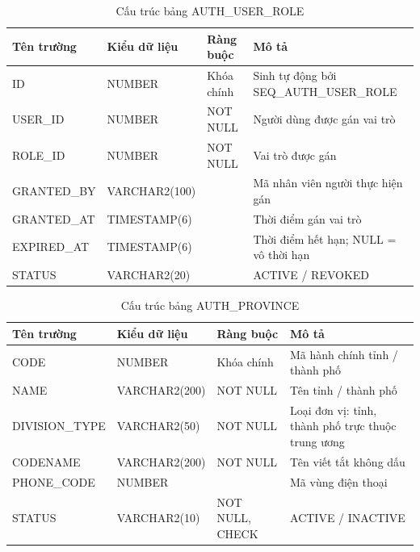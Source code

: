 \documentclass[../DoAn.tex]{subfiles}
\begin{document}
\begin{table}[H]
\centering
\caption{Cấu trúc bảng AUTH\_USER\_ROLE}
\label{tab:auth-user-role}
\footnotesize
\begin{tabular}{|p{3.0cm}|p{2.3cm}|p{2.7cm}|p{4.5cm}|}
\hline
\textbf{Tên trường} & \textbf{Kiểu dữ liệu} & \textbf{Ràng buộc} & \textbf{Mô tả} \\ \hline
ID & NUMBER & Khóa chính & Sinh tự động bởi SEQ\_AUTH\_USER\_ROLE \\ \hline
USER\_ID & NUMBER & NOT NULL & Người dùng được gán vai trò \\ \hline
ROLE\_ID & NUMBER & NOT NULL & Vai trò được gán \\ \hline
GRANTED\_BY & VARCHAR2(100) & & Mã nhân viên người thực hiện gán \\ \hline
GRANTED\_AT & TIMESTAMP(6) & & Thời điểm gán vai trò \\ \hline
EXPIRED\_AT & TIMESTAMP(6) & & Thời điểm hết hạn; NULL = vô thời hạn \\ \hline
STATUS & VARCHAR2(20) & & ACTIVE / REVOKED \\ \hline
\end{tabular}
\end{table}

\begin{table}[H]
\centering
\caption{Cấu trúc bảng AUTH\_PROVINCE}
\label{tab:auth-province}
\footnotesize
\begin{tabular}{|p{3.0cm}|p{2.3cm}|p{2.7cm}|p{4.5cm}|}
\hline
\textbf{Tên trường} & \textbf{Kiểu dữ liệu} & \textbf{Ràng buộc} & \textbf{Mô tả} \\ \hline
CODE & NUMBER & Khóa chính & Mã hành chính tỉnh / thành phố \\ \hline
NAME & VARCHAR2(200) & NOT NULL & Tên tỉnh / thành phố \\ \hline
DIVISION\_TYPE & VARCHAR2(50) & NOT NULL & Loại đơn vị: tỉnh, thành phố trực thuộc trung ương \\ \hline
CODENAME & VARCHAR2(200) & NOT NULL & Tên viết tắt không dấu \\ \hline
PHONE\_CODE & NUMBER & & Mã vùng điện thoại \\ \hline
STATUS & VARCHAR2(10) & NOT NULL, CHECK & ACTIVE / INACTIVE \\ \hline
\end{tabular}
\end{table}
\end{document}
